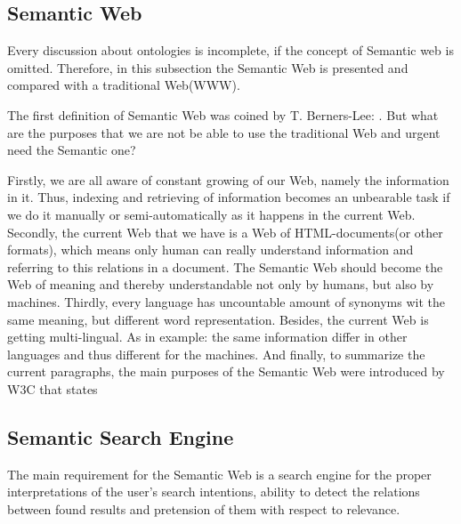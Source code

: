 		\subsection{Semantic Web}
		Every discussion about ontologies is incomplete, if the concept of Semantic web is omitted. Therefore, in this subsection the Semantic Web is presented and compared with a traditional Web(WWW).
		
		The first definition of Semantic Web was coined by T. Berners-Lee: \frqq. But what are the purposes that we are not be able to use the traditional Web and urgent need the Semantic one? 
		
		Firstly, we are all aware of constant growing of our Web, namely the information in it. Thus, indexing and retrieving of information becomes an unbearable task if we do it manually or semi-automatically as it happens in the current Web. Secondly, the current Web that we have is a Web of HTML-documents(or other formats), which means only human can really understand information and referring to this relations in a document. The Semantic Web should become the Web of meaning and thereby understandable not only by humans, but also by machines. Thirdly, every language has uncountable amount of synonyms wit the same meaning, but different word representation. Besides, the current Web is getting multi-lingual. As in example: \frqq \cite[p. 40 ]{Raj14} the same information differ in other languages and thus different for the machines. And finally, to summarize the current paragraphs, the main purposes of the Semantic Web were introduced by W3C that states  
		
		
		\subsection{Semantic Search Engine}
		The main requirement for the Semantic Web is a search engine for the proper interpretations of the user's search intentions, ability to detect the relations between found results and pretension of them with respect to relevance.
		

